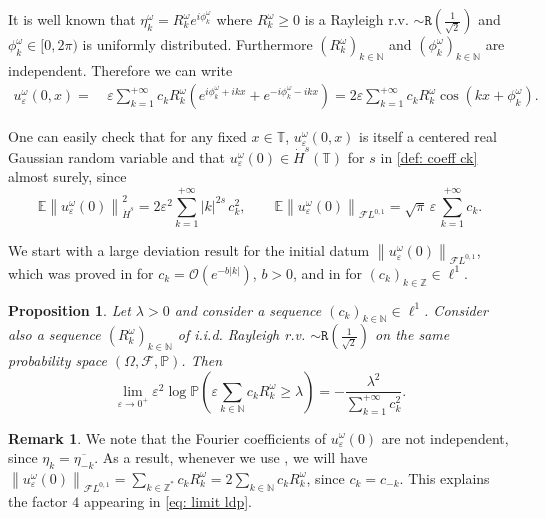 \documentclass[a4paper,10pt,reqno]{article}
\theoremstyle{definition}
\theoremstyle{plain}
\theoremstyle{plain}
\theoremstyle{definition}
\theoremstyle{plain}
\theoremstyle{plain}
\newtheorem{prop}[definition]{Proposition}
\theoremstyle{plain}
\theoremstyle{definition}
\newtheorem{rem}[definition]{Remark}
\theoremstyle{definition}
\newcommand{\norm}[1]{\left\lVert #1 \right\rVert}
\def \N{\mathbb N}
\def \Z{\mathbb Z}
\def \P{{\mathbb P}}
\def \O{\mathcal{O}}
\def \T{\mathbb{T}}
\def \FL{\mathcal{F}L}
\begin{document}
It is well known \cite{rayleigh} that $\eta_k^{\omega} = R_k^{\omega} e^{i \phi_k^{\omega}}$ where $R_k^{\omega} \ge 0$ is a Rayleigh r.v. $\sim \mathtt{R} \left ( \frac{1}{\sqrt{2}} \right )$ and $\phi_k^{\omega} \in [0,2\pi)$ is uniformly distributed.
Furthermore $(R_k^{\omega})_{k \in \N}$ and $(\phi_k^{\omega})_{k \in \N}$ are independent.
Therefore we can write
\begin{equation} \label{eq: random data}
\begin{split}
u_{\varepsilon}^{\omega}(0,x) =&\ \varepsilon \sum_{k=1}^{+\infty} c_k R_k^{\omega} \left ( e^{i \phi_k^{\omega} + ikx} + e^{-i \phi_k^{\omega} -ikx} \right ) = 2 \varepsilon \sum_{k=1}^{+\infty} c_k R_k^{\omega} \cos(kx + \phi_k^{\omega}).
\end{split}
\end{equation}

One can easily check that for any fixed $x \in \T$, $u_{\varepsilon}^{\omega}(0,x)$ is itself a centered real Gaussian random variable and that $u_{\varepsilon}^{\omega}(0) \in \dot{H}^{s}(\T)$ for $s$ in \eqref{def: coeff ck} almost surely, since 
\begin{equation} \label{eq: estimates random initial datum}
\mathbb{E}\norm{u_{\varepsilon}^{\omega}(0)}_{\dot{H}^s}^2 = 2 \varepsilon^2 \sum_{k = 1}^{+\infty} |k|^{2s}\, c_k^2, \qquad  \mathbb{E}\norm{u_{\varepsilon}^{\omega}(0)}_{\FL^{0,1}} = \sqrt{\pi}\, \varepsilon\, \sum_{k = 1}^{+\infty} c_k.
\end{equation}

\medskip 

We start with a large deviation result for the initial datum $\norm{u_{\varepsilon}^{\omega}(0)}_{\FL^{0,1}}$, 
which was proved in \cite[Section~2]{grande} for $c_k =\O( e^{-b|k|})$, $b>0$, and in \cite[Proposition~3.1]{liang} for $(c_k)_{k\in\Z}\in \ell^1$.

\begin{prop} \label{prop: grande}
Let $\lambda> 0$ and consider a sequence $(c_k)_{k \in \N}\in\ell^1$. Consider also a sequence
$(R_k^{\omega})_{k \in \N}$ of i.i.d. Rayleigh r.v. $\sim \mathtt{R} \left ( \frac{1}{\sqrt{2}} \right )$ on the same probability space $(\mathbb{\Omega}, \mathcal{F}, \P)$.
Then
\begin{equation} \label{eq: grande}
\lim_{\varepsilon \to 0^+} \varepsilon^2 \log \P \left ( \varepsilon \sum_{k \in \N} c_k R_k^{\omega} \ge \lambda \right ) = - \frac{\lambda^2}{\sum_{k=1}^{+\infty} c_k^2}.
\end{equation}
\end{prop}
\begin{rem}
   We note that the Fourier coefficients of $u_{\varepsilon}^{\omega}(0)$ are not independent, since $\eta_k = \overline{\eta_{-k}}$. As a result, whenever we use , we will have $\norm{u_{\varepsilon}^{\omega}(0)}_{\FL^{0,1}} = \sum_{k\in\Z^*} c_k R_k^{\omega} = 2 \sum_{k\in\N} c_k R_k^{\omega}$, since $c_k=c_{-k}$. This explains the factor $4$ appearing in \eqref{eq: limit ldp}.
\end{rem}
\end{document}
